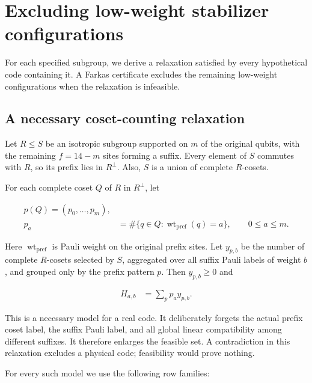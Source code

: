 \documentclass[11pt]{article}
\begin{document}
\section{Excluding low-weight stabilizer configurations}\label{excluding-low-weight-stabilizer-configurations}

For each specified subgroup, we derive a relaxation satisfied by every hypothetical code containing it. A Farkas certificate excludes the remaining low-weight configurations when the relaxation is infeasible.

\subsection{A necessary coset-counting relaxation}\label{a-necessary-coset-counting-relaxation}

Let \(R  \le  S\) be an isotropic subgroup supported on \(m\) of the original qubits, with the remaining \(f=14-m\) sites forming a suffix. Every element of \(S\) commutes with \(R\), so its prefix lies in \(R^\perp\). Also, \(S\) is a union of complete \(R\)-cosets.

For each complete coset \(Q\) of \(R\) in \(R^\perp\), let

\[
\begin{aligned}
p(Q)=(p_{0},\dots,p_{m}), \\
  p_{a} &=\#\{q \in Q : \operatorname{wt}_{\mathrm{pref}}(q)=a\},\qquad 0\leq a\leq m.
\end{aligned}
\]

Here \(\operatorname{wt}_{\mathrm{pref}}\) is Pauli weight on the original prefix sites.
Let \(y_{p,b}\) be the number of complete \(R\)-cosets selected by \(S\), aggregated over all suffix Pauli labels of weight \(b\), and grouped only by the prefix pattern \(p\). Then \(y_{p,b} \ge 0\) and

\[
\begin{aligned}
H_{a,b} &=\sum_{p} p_{a} y_{p,b}.
\end{aligned}
\]

This is a necessary model for a real code. It deliberately forgets the actual prefix coset label, the suffix Pauli label, and all global linear compatibility among different suffixes. It therefore enlarges the feasible set. A contradiction in this relaxation excludes a physical code; feasibility would prove nothing.

For every such model we use the following row families:
\end{document}
